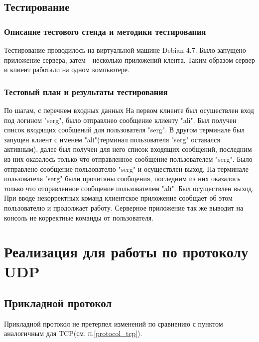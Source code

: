 \documentclass[12pt,a4paper]{report}
\begin{document}
\section{Тестирование}
\subsection{Описание тестового стенда и методики тестирования}
Тестирование проводилось на виртуальной машине Debian 4.7. Было запущено приложение сервера, затем - несколько приложений клента. Таким образом сервер и клиент работали на одном компьютере.
\subsection{Тестовый план и результаты тестирования}
По шагам, с перечнем входных данных
На первом клиенте был осуществлен вход под логином "serg", было отправлнео сообщение клиенту "ali". Был получен список входящих сообщений для пользователя "serg". В другом терминале был запущен клиент с именем "ali"(терминал пользователя "serg" оставался активным), далее был получен для него список входящих сообщений, последним из них оказалось только что отправленное сообщение пользователем "serg". Было отправлено сообщение пользователю "serg" и осуществлен выход. На терминале пользователя "serg" были прочитаны сообщения, последним из них оказалось только что отправленное сообщение пользователем "ali". Был осуществлен выход.
При вводе некорректных команд клиентское приложение сообщает об этом пользователю и продолжает работу. Серверное приложение так же выводит на консоль не корректные команды от пользователя.
\chapter{Реализация для работы по протоколу UDP}
\section{Прикладной протокол}

Прикладной протокол не претерпел изменений по сравнению с пунктом аналогичным для TCP(см. п.\ref{protocol_tcp}).
\end{document}
